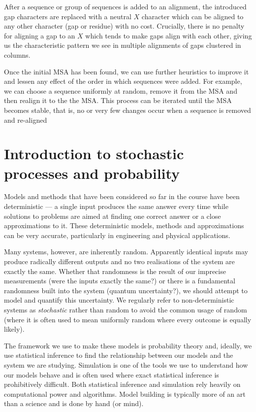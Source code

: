 \documentclass[11pt]{article}
\begin{document}
After a sequence or group of sequences is added to an alignment, the introduced gap characters are replaced with a neutral $X$ character which can be aligned to any other character (gap or residue) with no cost. Crucially, there is no penalty for aligning a gap to an $X$  which tends to make gaps align with each other, giving us the characteristic pattern we see in multiple alignments of gaps clustered in columns.

Once the initial MSA has been found, we can use further heuristics to improve it and lessen any effect  of the order in which sequences were added.  For example, we can choose a sequence uniformly at random, remove it from the MSA and then realign it to the the MSA.  This process can be iterated until the MSA becomes stable, that is, no or very few changes occur when a sequence is removed and re-aligned  


\newpage 

\section{Introduction to stochastic processes and probability}

Models and methods that have been considered so far in the course have been deterministic --- a single input produces the same answer every time while solutions to problems are aimed at finding one correct answer or a close approximations to it.  These deterministic models, methods and approximations can be very accurate, particularly in engineering and physical applications.  

Many systems, however,  are inherently random.   Apparently identical inputs may produce radically different outputs and no two realisations of the system are exactly the same.    Whether that randomness is  the result of our imprecise measurements (were the inputs exactly the same?) or there is a fundamental randomness built into the system (quantum uncertainty?), we should attempt to model and quantify this uncertainty. We regularly refer to non-deterministic systems as {\em stochastic} rather than random to avoid the common usage of random (where it is often used to mean uniformly random where every outcome is equally likely).

The framework we use to make these models is probability theory and, ideally, we use statistical inference to find the relationship between our models and the system we are studying.  Simulation is one of the tools we use to understand how our models behave and is often  used where exact statistical inference is prohibitively difficult.   Both statistical inference and simulation rely heavily on computational power and algorithms.  Model building is typically more of an art than a science and is done by hand (or mind). 
\end{document}
